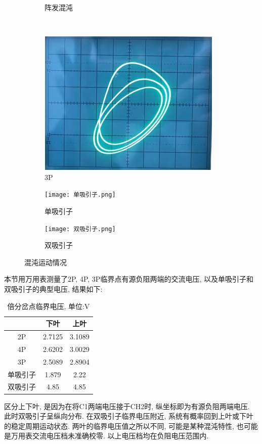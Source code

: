 \documentclass[12pt,a4paper]{article}
\begin{document}
\begin{figure}[H]
\begin{subfigure}[b]{0.3\textwidth}
        \caption{阵发混沌}
      \end{subfigure}
      \\
      \begin{subfigure}[b]{0.3\textwidth}
        \centering
        \includegraphics[width=\textwidth]{3P.png}
        \caption{3P}
      \end{subfigure}
      \hfill
      \begin{subfigure}[b]{0.3\textwidth}
        \centering
        \texttt{[image: 单吸引子.png]}
        \caption{单吸引子}
      \end{subfigure}
      \hfill
      \begin{subfigure}[b]{0.3\textwidth}
        \centering
        \texttt{[image: 双吸引子.png]}
        \caption{双吸引子}
      \end{subfigure}
    \caption{混沌运动情况}
  \end{figure}
本节用万用表测量了2P, 4P, 3P临界点有源负阻两端的交流电压, 以及单吸引子和双吸引子的典型电压, 结果如下: 
\begin{table}[H]
    \centering
    \begin{tabular}{|c|c|c|}
    \hline
         & 下叶     & 上叶     \\ \hline
    2P   & 2.7125 & 3.1089 \\ \hline
    4P   & 2.6202 & 3.0029 \\ \hline
    3P   & 2.5089 & 2.8904 \\ \hline
    单吸引子 & 1.879  & 2.22   \\ \hline
    双吸引子 & 4.85   & 4.85   \\ \hline
    \end{tabular}
    \caption{倍分岔点临界电压, 单位:V}
    \end{table}
区分上下叶, 是因为在将C1两端电压接于CH2时, 纵坐标即为有源负阻两端电压. 此时双吸引子呈纵向分布. 在双吸引子临界电压附近, 系统有概率回到上叶或下叶的稳定周期运动状态. 
两叶的临界电压值之所以不同, 可能是某种混沌特性, 也可能是万用表交流电压档未准确校零. 以上电压档均在负阻电压范围内. 
\end{document}
